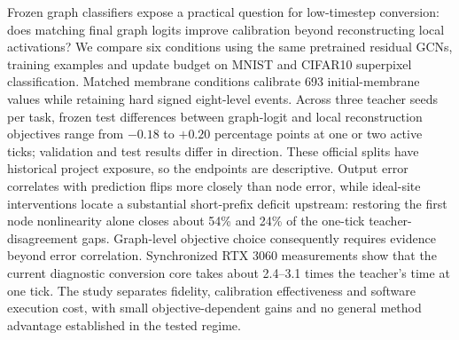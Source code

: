 Frozen graph classifiers expose a practical question for low-timestep conversion: does matching final graph logits improve calibration beyond reconstructing local activations? We compare six conditions using the same pretrained residual GCNs, training examples and update budget on MNIST and CIFAR10 superpixel classification. Matched membrane conditions calibrate 693 initial-membrane values while retaining hard signed eight-level events. Across three teacher seeds per task, frozen test differences between graph-logit and local reconstruction objectives range from $-0.18$ to $+0.20$ percentage points at one or two active ticks; validation and test results differ in direction. These official splits have historical project exposure, so the endpoints are descriptive. Output error correlates with prediction flips more closely than node error, while ideal-site interventions locate a substantial short-prefix deficit upstream: restoring the first node nonlinearity alone closes about 54\% and 24\% of the one-tick teacher-disagreement gaps. Graph-level objective choice consequently requires evidence beyond error correlation. Synchronized RTX 3060 measurements show that the current diagnostic conversion core takes about 2.4--3.1 times the teacher's time at one tick. The study separates fidelity, calibration effectiveness and software execution cost, with small objective-dependent gains and no general method advantage established in the tested regime.
